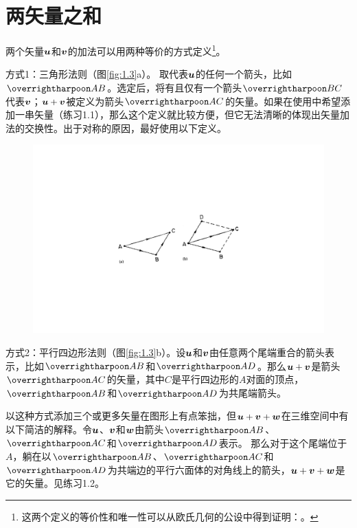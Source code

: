 \section{两矢量之和}

两个矢量$\boldsymbol{u}$和$\boldsymbol{v}$的加法可以用两种等价的方式定义\footnote{这两个定义的等价性和唯一性可以从欧氏几何的公设中得到证明：。}。

方式1：三角形法则（图\eqref{fig:1.3}a）。 取代表$\boldsymbol{u}$的任何一个箭头，比如$\rr{AB}$。选定后，将有且仅有一个箭头$\rr{BC}$代表$\boldsymbol{v}$；$\boldsymbol{u}+\boldsymbol{v}$被定义为箭头$\rr{AC}$的矢量。如果在使用中希望添加一串矢量（练习1.1），那么这个定义就比较方便，但它无法清晰的体现出矢量加法的交换性。出于对称的原因，最好使用以下定义。

\begin{figure}[htbp]
	\centering
	\includegraphics{./image/1.3.pdf}
	\caption{}
	\label{fig:1.3}
\end{figure}

方式2：平行四边形法则（图\eqref{fig:1.3}b）。设$\boldsymbol{u}$和$\boldsymbol{v}$由任意两个尾端重合的箭头表示，比如$\rr{AB}$和$\rr{AD}$。那么$\boldsymbol{u}+\boldsymbol{v}$是箭头$\rr{AC}$的矢量，其中$C$是平行四边形的$A$对面的顶点，$\rr{AB}$和$\rr{AD}$为共尾端箭头。

以这种方式添加三个或更多矢量在图形上有点笨拙，但$\boldsymbol{u}+\boldsymbol{v}+\boldsymbol{w}$在三维空间中有以下简洁的解释。令$\boldsymbol{u}$、$\boldsymbol{v}$和$\boldsymbol{w}$由箭头$\rr{AB}$、$\rr{AC}$和$\rr{AD}$表示。 那么对于这个尾端位于$A$，躺在以$\rr{AB}$、$\rr{AC}$和$\rr{AD}$为共端边的平行六面体的对角线上的箭头，$\boldsymbol{u}+\boldsymbol{v}+\boldsymbol{w}$是它的矢量。见练习1.2。